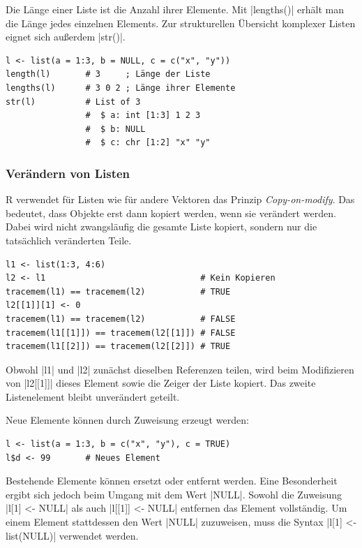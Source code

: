 \documentclass[10pt,twocolumn]{scrartcl}
\renewcommand{\lstinline}{\mycoloredinline}
\begin{document}
Die Länge einer Liste ist die Anzahl ihrer Elemente.
Mit \lstinline|lengths()| erhält man die Länge jedes einzelnen Elements.
Zur strukturellen Übersicht komplexer Listen eignet sich außerdem \lstinline|str()|.

\begin{lstlisting}
l <- list(a = 1:3, b = NULL, c = c("x", "y"))
length(l)       # 3     ; Länge der Liste
lengths(l)      # 3 0 2 ; Länge ihrer Elemente
str(l)          # List of 3
                #  $ a: int [1:3] 1 2 3
                #  $ b: NULL
                #  $ c: chr [1:2] "x" "y"
\end{lstlisting}


\subsubsection{Verändern von Listen}

R verwendet für Listen wie für andere Vektoren das Prinzip
\emph{Copy-on-modify}. Das bedeutet, dass Objekte erst dann kopiert werden,
wenn sie verändert werden. Dabei wird nicht zwangsläufig die gesamte Liste
kopiert, sondern nur die tatsächlich veränderten Teile.

\begin{lstlisting}
l1 <- list(1:3, 4:6)
l2 <- l1                               # Kein Kopieren
tracemem(l1) == tracemem(l2)           # TRUE
l2[[1]][1] <- 0
tracemem(l1) == tracemem(l2)           # FALSE
tracemem(l1[[1]]) == tracemem(l2[[1]]) # FALSE
tracemem(l1[[2]]) == tracemem(l2[[2]]) # TRUE
\end{lstlisting}

Obwohl \lstinline|l1| und \lstinline|l2| zunächst dieselben Referenzen teilen, wird beim Modifizieren von \lstinline|l2[[1]]| dieses Element sowie die Zeiger der Liste kopiert. Das zweite Listenelement bleibt unverändert geteilt.

Neue Elemente können durch Zuweisung erzeugt werden:

\begin{lstlisting}
l <- list(a = 1:3, b = c("x", "y"), c = TRUE)
l$d <- 99       # Neues Element
\end{lstlisting}

Bestehende Elemente können ersetzt oder entfernt werden. Eine Besonderheit ergibt sich jedoch beim Umgang mit dem Wert \lstinline|NULL|. Sowohl die Zuweisung \lstinline|l[1] <- NULL| als auch \lstinline|l[[1]] <- NULL| entfernen das Element vollständig. Um einem Element stattdessen den Wert \lstinline|NULL| zuzuweisen, muss die Syntax \lstinline|l[1] <- list(NULL)| verwendet werden.
\end{document}
